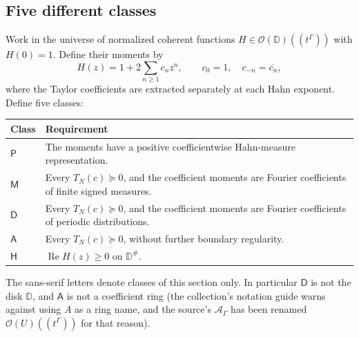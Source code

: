 \documentclass[11pt,letterpaper]{article}
\theoremstyle{definition}
\newcommand{\D}{\mathbb D}\newcommand{\No}{\mathbf{No}}
\newcommand{\OU}[1]{\mathcal O(#1)((t^\Gamma))}
\newcommand{\Rea}{\operatorname{Re}}
\newcommand{\halo}[1]{#1^{\#}}
\numberwithin{equation}{section}
\begin{document}
\subsection{Five different classes}

Work in the universe of normalized coherent functions $H\in\OU{\D}$ with $H(0)=1$. Define their moments by
\[
 H(z)=1+2\sum_{n\ge1}c_nz^n,\qquad c_0=1,
 \quad c_{-n}=\overline{c_n},
\]
where the Taylor coefficients are extracted separately at each Hahn exponent. Define five classes:
\begin{center}
\begin{tabularx}{\textwidth}{@{}lX@{}}
\toprule
Class & Requirement\\
\midrule
$\mathsf P$ & The moments have a positive coefficientwise Hahn-measure representation.\\
$\mathsf M$ & Every $T_N(c)\succeq0$, and the coefficient moments are Fourier coefficients of finite signed measures.\\
$\mathsf D$ & Every $T_N(c)\succeq0$, and the coefficient moments are Fourier coefficients of periodic distributions.\\
$\mathsf A$ & Every $T_N(c)\succeq0$, without further boundary regularity.\\
$\mathsf H$ & $\Rea H(z)\ge0$ on $\halo\D$.\\
\bottomrule
\end{tabularx}
\end{center}
The sans-serif letters denote classes of this section only. In particular $\mathsf D$ is not the disk $\D$, and $\mathsf A$ is not a coefficient ring (the collection's notation guide warns against using $A$ as a ring name, and the source's $\mathscr A_\Gamma$ has been renamed $\OU{U}$ for that reason).
\end{document}
